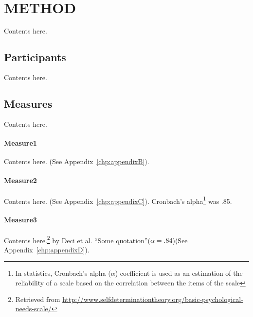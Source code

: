 \chapter {METHOD}
\label {chp:method}
Contents here.

\section {Participants}
Contents here.
\section {Measures}
Contents here.
		\subsubsection {Measure1}
Contents here. (See Appendix~\ref{chp:appendixB}).
		\subsubsection {Measure2}
Contents here. (See Appendix~\ref{chp:appendixC}). Cronbach's alpha\footnote{\label{fn}In statistics, Cronbach's alpha ($\alpha$) coefficient is used as an estimation of the reliability of a scale based on the correlation between the items of the scale} was .85.
		\subsubsection {Measure3}
		Contents here.\footnote{Retrieved from \scriptsize \url{http://www.selfdeterminationtheory.org/basic-psychological-needs-scale/}} by Deci et al.\cite{deci2001need} ``Some quotation''($\alpha = .84$)\footnotemark[\getrefnumber{fn}] (See Appendix~\ref{chp:appendixD}). 



